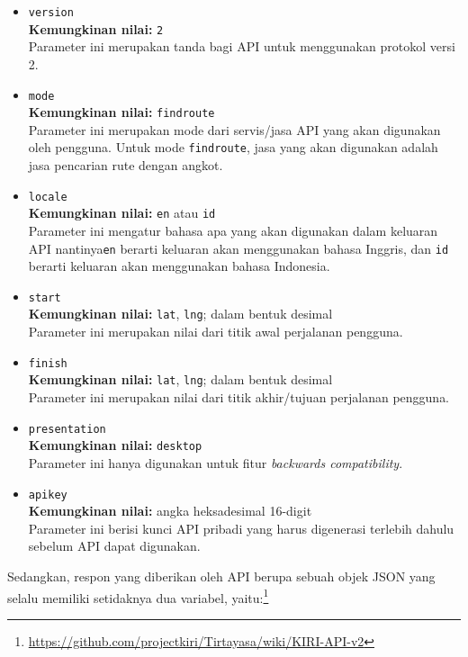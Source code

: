 \begin{itemize}
	\item \verb|version|\\
	\textbf{Kemungkinan nilai:} \verb|2|\\
	Parameter ini merupakan tanda bagi API untuk menggunakan protokol versi 2.
	\item \verb|mode|\\
	\textbf{Kemungkinan nilai:} \verb|findroute|\\
	Parameter ini merupakan mode dari servis/jasa API yang akan digunakan oleh pengguna. Untuk mode \verb|findroute|, jasa yang akan digunakan adalah jasa pencarian rute dengan angkot.
	\item \verb|locale|\\
	\textbf{Kemungkinan nilai:} \verb|en| atau \verb|id|\\
	Parameter ini mengatur bahasa apa yang akan digunakan dalam keluaran API nantinya\textemdash\verb|en| berarti keluaran akan menggunakan bahasa Inggris, dan \verb|id| berarti keluaran akan menggunakan bahasa Indonesia.
	\item \verb|start|\\
	\textbf{Kemungkinan nilai:} \verb|lat|, \verb|lng|; dalam bentuk desimal\\
	Parameter ini merupakan nilai \latlon dari titik awal perjalanan pengguna.
	\item \verb|finish|\\
	\textbf{Kemungkinan nilai:} \verb|lat|, \verb|lng|; dalam bentuk desimal\\
	Parameter ini merupakan nilai \latlon dari titik akhir/tujuan perjalanan pengguna.
	\item \verb|presentation|\\
	\textbf{Kemungkinan nilai:} \verb|desktop|\\
	Parameter ini hanya digunakan untuk fitur \textit{backwards compatibility}.
	\item \verb|apikey|\\
	\textbf{Kemungkinan nilai:} angka heksadesimal 16-digit\\
	Parameter ini berisi kunci API pribadi yang harus digenerasi terlebih dahulu sebelum API dapat digunakan.
\end{itemize}

Sedangkan, respon yang diberikan oleh API berupa sebuah objek JSON yang selalu memiliki setidaknya dua variabel, yaitu:\footnote{\href{https://github.com/projectkiri/Tirtayasa/wiki/KIRI-API-v2}{https://github.com/projectkiri/Tirtayasa/wiki/KIRI-API-v2}}

